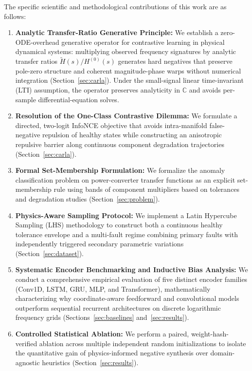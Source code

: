 \documentclass[11pt,a4paper]{article}
\begin{document}
The specific scientific and methodological contributions of this work are as follows:
\begin{enumerate}
    \item \textbf{Analytic Transfer-Ratio Generative Principle:} We establish a zero-ODE-overhead generative operator for contrastive learning in physical dynamical systems: multiplying observed frequency signatures by analytic transfer ratios $\tilde{H}(s)/H^{(0)}(s)$ generates hard negatives that preserve pole-zero structure and coherent magnitude-phase warps without numerical integration (Section~\ref{sec:carla}). Under the small-signal linear time-invariant (LTI) assumption, the operator preserves analyticity in $\mathbb{C}$ and avoids per-sample differential-equation solves.
    \item \textbf{Resolution of the One-Class Contrastive Dilemma:} We formulate a directed, two-logit InfoNCE objective that avoids intra-manifold false-negative repulsion of healthy states while constructing an anisotropic repulsive barrier along continuous component degradation trajectories (Section~\ref{sec:carla}).
    \item \textbf{Formal Set-Membership Formulation:} We formalize the anomaly classification problem on power-converter transfer functions as an explicit set-membership rule using bands of component multipliers based on tolerances and degradation studies (Section~\ref{sec:problem}).
    \item \textbf{Physics-Aware Sampling Protocol:} We implement a Latin Hypercube Sampling (LHS) methodology to construct both a continuous healthy tolerance envelope and a multi-fault regime combining primary faults with independently triggered secondary parametric variations (Section~\ref{sec:dataset}).
    \item \textbf{Systematic Encoder Benchmarking and Inductive Bias Analysis:} We conduct a comprehensive empirical evaluation of five distinct encoder families (Conv1D, LSTM, GRU, MLP, and Transformer), mathematically characterizing why coordinate-aware feedforward and convolutional models outperform sequential recurrent architectures on discrete logarithmic frequency grids (Sections~\ref{sec:baselines} and~\ref{sec:results}).
    \item \textbf{Controlled Statistical Ablation:} We perform a paired, weight-hash-verified ablation across multiple independent random initializations to isolate the quantitative gain of physics-informed negative synthesis over domain-agnostic heuristics (Section~\ref{sec:results}).
\end{enumerate}
\end{document}
